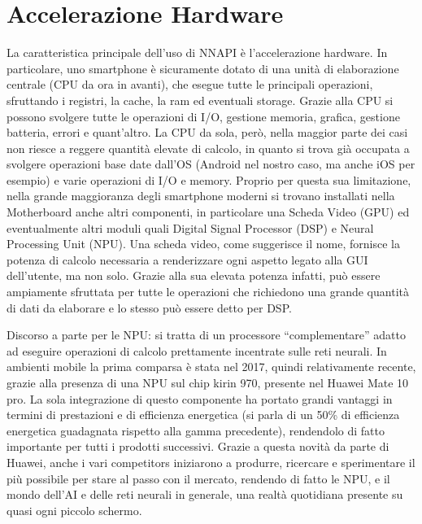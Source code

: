 \section{Accelerazione Hardware}
La caratteristica principale dell’uso di NNAPI\cite{NNAPI} è l’accelerazione hardware. In particolare, uno smartphone è sicuramente dotato di una unità di elaborazione
centrale (CPU da ora in avanti), che esegue tutte le principali operazioni, sfruttando i registri, la cache, la ram ed eventuali storage. Grazie alla CPU
si possono svolgere tutte le operazioni di I/O, gestione memoria, grafica, gestione batteria, errori e quant’altro.
La CPU da sola, però, nella maggior parte dei casi non riesce a reggere quantità elevate di calcolo, in quanto si trova già occupata a svolgere operazioni
base date dall’OS (Android nel nostro caso, ma anche iOS per esempio) e varie operazioni di I/O e memory. Proprio per questa sua limitazione, nella grande
maggioranza degli smartphone moderni si trovano installati nella Motherboard anche altri componenti, in particolare una Scheda Video (GPU) ed eventualmente
altri moduli quali Digital Signal Processor (DSP) e Neural Processing Unit (NPU). 
Una scheda video, come suggerisce il nome, fornisce la potenza di calcolo necessaria a renderizzare ogni aspetto legato alla GUI dell’utente, ma non solo.
Grazie alla sua elevata potenza infatti, può essere ampiamente sfruttata per tutte le operazioni che richiedono una grande quantità di dati da elaborare e
lo stesso può essere detto per DSP. 

Discorso a parte per le NPU: si tratta di un processore “complementare” adatto ad eseguire operazioni di calcolo prettamente incentrate sulle reti neurali.
In ambienti mobile la prima comparsa è stata nel 2017, quindi relativamente recente, grazie alla presenza di una NPU sul chip kirin 970, presente nel Huawei
Mate 10 pro.
La sola integrazione di questo componente ha portato grandi vantaggi in termini di prestazioni e di efficienza energetica (si parla di un 50\% di efficienza
energetica guadagnata rispetto alla gamma precedente), rendendolo di fatto importante per tutti i prodotti successivi. Grazie a questa novità da parte di
Huawei, anche i vari competitors iniziarono a produrre, ricercare e sperimentare il più possibile per stare al passo con il mercato, rendendo di fatto le NPU,
e il mondo dell’AI e delle reti neurali in generale, una realtà quotidiana presente su quasi ogni piccolo schermo.

